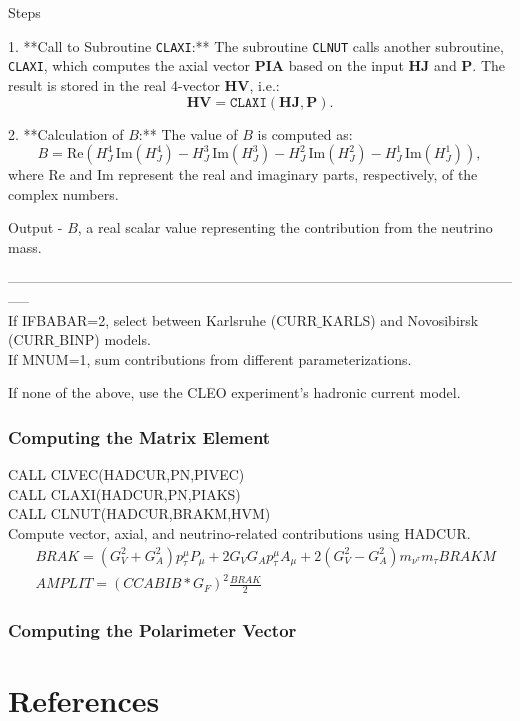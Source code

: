 \documentclass[12pt]{article}
\begin{document}
Steps

1. **Call to Subroutine \texttt{CLAXI}:**
   The subroutine \texttt{CLNUT} calls another subroutine, \texttt{CLAXI}, which computes the axial vector \(\mathbf{PIA}\) based on the input \(\mathbf{HJ}\) and \(\mathbf{P}\). The result is stored in the real 4-vector \(\mathbf{HV}\), i.e.:
   \[
   \mathbf{HV} = \texttt{CLAXI}(\mathbf{HJ}, \mathbf{P}).
   \]

2. **Calculation of \(B\):**
   The value of \(B\) is computed as:
   \[
   B = \text{Re} \left( H_J^4 \, \text{Im}(H_J^4) - H_J^3 \, \text{Im}(H_J^3) - H_J^2 \, \text{Im}(H_J^2) - H_J^1 \, \text{Im}(H_J^1) \right),
   \]
   where \(\text{Re}\) and \(\text{Im}\) represent the real and imaginary parts, respectively, of the complex numbers.

 Output
- \(B\), a real scalar value representing the contribution from the neutrino mass.


-----------------------------------------------------------------------------------------------------------------\\

If IFBABAR=2, select between Karlsruhe (CURR$\_$KARLS) and Novosibirsk (CURR$\_$BINP) models.\\


If MNUM=1, sum contributions from different parameterizations.



If none of the above, use the CLEO experiment's hadronic current model.


\subsubsection{Computing the Matrix Element}

CALL CLVEC(HADCUR,PN,PIVEC)\\
CALL CLAXI(HADCUR,PN,PIAKS)\\
CALL CLNUT(HADCUR,BRAKM,HVM)\\

Compute vector, axial, and neutrino-related contributions using HADCUR.\\


\begin{align*}
&BRAK = (G_V^2 + G_A^2) p_\tau^\mu P_\mu  + 2G_VG_A p_\tau^\mu A_\mu + 2(G_V^2- G_A^2)m_{\nu^\tau}m_\tau BRAKM\\
&AMPLIT = (CCABIB* G_F)^2 \frac{BRAK}{2}
\end{align*}

\subsubsection{Computing the Polarimeter Vector}








\newpage
\section*{References}
\nocite{Siepe2024}
\printbibliography[heading=none]
\end{document}
